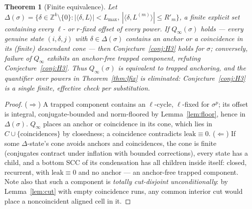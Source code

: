 \documentclass[11pt]{article}
\newtheorem{theorem}{Theorem}[section]
\newcommand{\Z}{\mathbb{Z}}
\begin{document}
\begin{theorem}[Finite equivalence]\label{thm:qinf}
Let $\Delta(\sigma)=\{\delta\in\Z^k\setminus\{0\}:
|\langle\delta,L\rangle|<L_{\max},\
|\langle\delta,L^{(m)}\rangle|\le R'_m\}$, a finite explicit set
containing every $\ell$- or $r$-fixed offset of every power. If
$Q_\infty(\sigma)$ holds --- \emph{every genuine state
$(i,\delta,j)$ with $\delta\in\Delta(\sigma)$ contains an anchor or a
coincidence in its (finite) descendant cone} --- then
Conjecture~\ref{conj:H3} holds for $\sigma$; conversely, failure of
$Q_\infty$ exhibits an anchor-free trapped component, refuting
Conjecture~\ref{conj:H3}. Thus $Q_\infty(\sigma)$ is \emph{equivalent}
to trapped anchoring, and the quantifier over powers in
Theorem~\ref{thm:lfix} is eliminated: Conjecture~\ref{conj:H3} is a
single finite, effective check per substitution.
\end{theorem}

\begin{proof}
($\Rightarrow$) A trapped component contains an $\ell$-cycle,
$\ell$-fixed for $\sigma^p$; its offset is integral, conjugate-bounded
and norm-floored by Lemma~\ref{lem:floor}, hence in $\Delta(\sigma)$.
$Q_\infty$ places an anchor or coincidence in its cone, which lies in
$C\cup\{\text{coincidences}\}$ by closedness; a coincidence contradicts
$\mathrm{leak}\equiv0$. ($\Leftarrow$) If some $\Delta$-state's cone
avoids anchors and coincidences, the cone is finite (conjugates contract
under inflation with bounded corrections), every state has a child, and
a bottom SCC of its condensation has all children inside itself: closed,
recurrent, with $\mathrm{leak}\equiv0$ and no anchor --- an anchor-free
trapped component. Note also that such a component is \emph{totally
cut-disjoint unconditionally}: by Lemma~\ref{lem:cut} with empty
coincidence runs, any common interior cut would place a noncoincident
aligned cell in it.
\end{proof}
\end{document}
